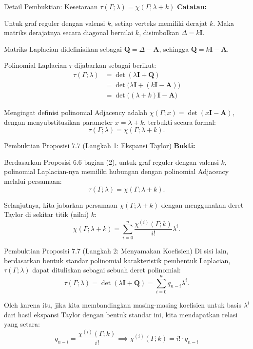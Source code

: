 ﻿\documentclass[aspectratio=169]{beamer}
\begin{document}
\begin{frame}{Detail Pembuktian: Kesetaraan $\tau(\Gamma; \lambda) = \chi(\Gamma; \lambda + k)$}
  \textbf{Catatan:}

  Untuk graf reguler dengan valensi $k$, setiap verteks memiliki derajat $k$. Maka matriks derajatnya secara diagonal bernilai $k$, disimbolkan $\Delta = k\mathbf{I}$.

  \vspace{0.2cm}
  Matriks Laplacian didefinisikan sebagai $\mathbf{Q} = \Delta - \mathbf{A}$, sehingga \textbf{$\mathbf{Q} = k\mathbf{I} - \mathbf{A}$}.

  Polinomial Laplacian $\tau$ dijabarkan sebagai berikut:
  \begin{align*}
    \tau(\Gamma; \lambda) & = \det(\lambda \mathbf{I} + \mathbf{Q})                         \\
                          & = \det\Big(\lambda \mathbf{I} + (k\mathbf{I} - \mathbf{A})\Big) \\
                          & = \det\Big((\lambda + k)\mathbf{I} - \mathbf{A}\Big)
  \end{align*}

  Mengingat definisi polinomial Adjacency adalah $\chi(\Gamma; x) = \det(x\mathbf{I} - \mathbf{A})$, dengan menyubstitusikan parameter $x = \lambda + k$, terbukti secara formal:
  $$ \tau(\Gamma; \lambda) = \chi(\Gamma; \lambda + k). $$
\end{frame}

\begin{frame}{Pembuktian Proposisi 7.7 (Langkah 1: Ekspansi Taylor)}
  \textbf{Bukti:}

  Berdasarkan Proposisi 6.6 bagian (2), untuk graf reguler dengan valensi $k$, polinomial Laplacian-nya memiliki hubungan dengan polinomial Adjacency melalui persamaan:
  $$ \tau(\Gamma; \lambda) = \chi(\Gamma; \lambda + k). $$

  Selanjutnya, kita jabarkan persamaan $\chi(\Gamma; \lambda + k)$ dengan menggunakan deret Taylor di sekitar titik (nilai) $k$:
  $$ \chi(\Gamma; \lambda + k) = \sum_{i=0}^{n} \frac{\chi^{(i)}(\Gamma; k)}{i!} \lambda^i. $$
\end{frame}

\begin{frame}{Pembuktian Proposisi 7.7 (Langkah 2: Menyamakan Koefisien)}
  Di sisi lain, berdasarkan bentuk standar polinomial karakteristik pembentuk Laplacian, $\tau(\Gamma; \lambda)$ dapat dituliskan sebagai sebuah deret polinomial:
  $$ \tau(\Gamma; \lambda) = \det(\lambda \mathbf{I} + \mathbf{Q}) = \sum_{i=0}^{n} q_{n-i} \lambda^i. $$

  Oleh karena itu, jika kita membandingkan masing-masing koefisien untuk basis $\lambda^i$ dari hasil ekspansi Taylor dengan bentuk standar ini, kita mendapatkan relasi yang setara:
  $$ q_{n-i} = \frac{\chi^{(i)}(\Gamma; k)}{i!} \implies \chi^{(i)}(\Gamma; k) = i! \cdot q_{n-i} $$
\end{frame}
\end{document}
